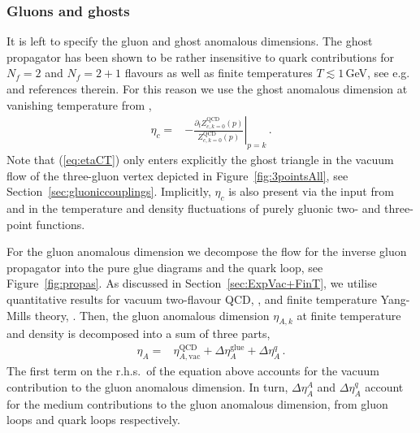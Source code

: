 \documentclass[%
reprint,
superscriptaddress,
showpacs,preprintnumbers,
 amsmath,amssymb,
 aps,
prd,
]{revtex4-1}
\def\Fig#1{Figure~\ref{#1}}
\def\eq#1{(\ref{#1})}
\def\fig#1{Figure~\ref{#1}}
\def\sec#1{Section~\ref{#1}}
\begin{document}
\subsubsection{Gluons and ghosts}\label{sec:GlueSector}

It is left to specify the gluon and ghost anomalous dimensions. The
ghost propagator has been shown to be rather insensitive to quark
contributions for $N_f=2$ and $N_f=2+1$ flavours as well as finite
temperatures $T\lesssim 1$\,GeV, see e.g.\ \cite{Cyrol:2017qkl} and
references therein.  For this reason we use the ghost anomalous
dimension at vanishing temperature from \cite{Cyrol:2017ewj},
%
\begin{align}
  \eta_{c}=&-\left. \frac{\partial_t
             Z^{\text{QCD}}_{c, k=0}(p)}{
             Z^{\text{QCD}}_{c, k=0}(p)}\right|_{p=k}\,.\label{eq:etaCT}
\end{align}
%
Note that \eq{eq:etaCT} only enters explicitly the ghost triangle in
the vacuum flow of the three-gluon vertex depicted in
\fig{fig:3pointsAll}, see \sec{sec:gluoniccouplings}. Implicitly,
$\eta_c$ is also present via the input from
\cite{Cyrol:2017ewj,Cyrol:2017qkl} and in the temperature and density
fluctuations of purely gluonic two- and three-point functions.

For the gluon anomalous dimension we decompose the flow for the
inverse gluon propagator into the pure glue diagrams and the quark
loop, see \Fig{fig:propas}. As discussed in \sec{sec:ExpVac+FinT}, we
utilise quantitative results for vacuum two-flavour QCD,
\cite{Cyrol:2017ewj}, and finite temperature Yang-Mills theory,
\cite{Cyrol:2017qkl}. Then, the gluon anomalous dimension $\eta_{A,k}$
at finite temperature and density is decomposed into a sum of three
parts,
%
\begin{align}
  \eta_{A}=&\eta_{A,\textrm{vac}}^{\text{QCD}}+
             \Delta\eta_{A}^{\text{glue}}+
             \Delta\eta_{A}^{q}\,.\label{eq:etaAT}
\end{align}
%
The first term on the r.h.s.\ of the equation above accounts for the
vacuum contribution to the gluon anomalous dimension. In turn,
$\Delta\eta_A^A$ and $\Delta \eta^q_A$ account for the medium
contributions to the gluon anomalous dimension, from gluon loops and
quark loops respectively.
\end{document}
